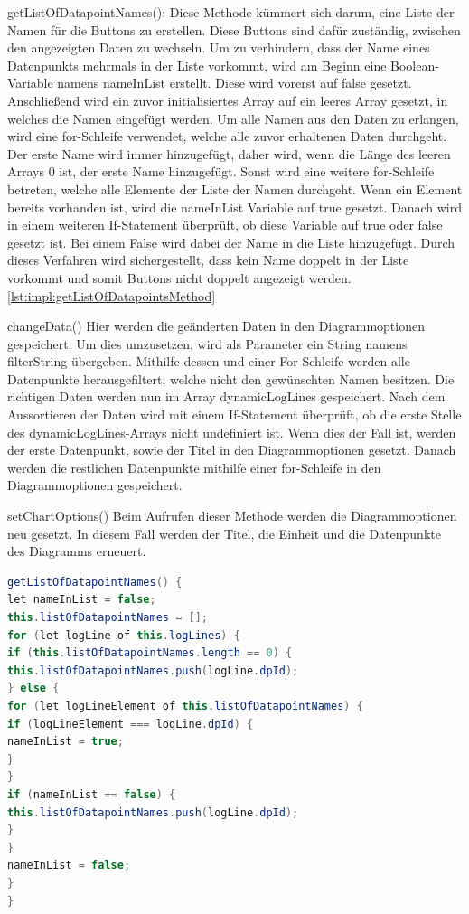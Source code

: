 \begin{compactitem}
\item getListOfDatapointNames(): Diese Methode kümmert sich darum, eine Liste der Namen für die Buttons zu erstellen. Diese Buttons sind dafür zuständig, zwischen den angezeigten Daten zu wechseln.
Um zu verhindern, dass der Name eines Datenpunkts mehrmals in der Liste vorkommt, wird am Beginn eine Boolean-Variable namens nameInList erstellt. Diese wird vorerst auf false gesetzt.
Anschließend wird ein zuvor initialisiertes Array auf ein leeres Array gesetzt, in welches die Namen eingefügt werden. Um alle Namen aus den Daten zu erlangen, wird eine for-Schleife verwendet, welche alle zuvor erhaltenen Daten durchgeht. Der erste Name wird immer hinzugefügt, daher wird, wenn die Länge des leeren Arrays 0 ist, der erste Name hinzugefügt. Sonst wird eine weitere for-Schleife betreten, welche alle Elemente der Liste der Namen durchgeht. Wenn ein Element bereits vorhanden ist, wird die nameInList Variable auf true gesetzt. Danach wird in einem weiteren If-Statement überprüft, ob diese Variable auf true oder false gesetzt ist. Bei einem False wird dabei der Name in die Liste hinzugefügt. Durch dieses Verfahren wird sichergestellt, dass kein Name doppelt in der Liste vorkommt und somit Buttons nicht doppelt angezeigt werden. \ref{lst:impl:getListOfDatapointsMethod}
\item changeData()
Hier werden die geänderten Daten in den Diagrammoptionen gespeichert. Um dies umzusetzen, wird als Parameter ein String namens filterString übergeben. Mithilfe dessen und einer For-Schleife werden alle Datenpunkte herausgefiltert, welche nicht den gewünschten Namen besitzen. Die richtigen Daten werden nun im Array dynamicLogLines gespeichert. Nach dem Aussortieren der Daten wird mit einem If-Statement überprüft, ob die erste Stelle des dynamicLogLines-Arrays nicht undefiniert ist. Wenn dies der Fall ist, werden der erste Datenpunkt, sowie der Titel in den Diagrammoptionen gesetzt. Danach werden die restlichen Datenpunkte mithilfe einer for-Schleife in den Diagrammoptionen gespeichert.
\item setChartOptions()
Beim Aufrufen dieser Methode werden die Diagrammoptionen neu gesetzt. In diesem Fall werden der Titel, die Einheit und die Datenpunkte des Diagramms erneuert.
\end{compactitem}




\begin{lstlisting}[language=java,caption=getListOfDatapointNames()-Methode,label=lst:impl:getListOfDatapointsMethod]
getListOfDatapointNames() {
let nameInList = false;
this.listOfDatapointNames = [];
for (let logLine of this.logLines) {
if (this.listOfDatapointNames.length == 0) {
this.listOfDatapointNames.push(logLine.dpId);
} else {
for (let logLineElement of this.listOfDatapointNames) {
if (logLineElement === logLine.dpId) {
nameInList = true;
}
}
if (nameInList == false) {
this.listOfDatapointNames.push(logLine.dpId);
}
}
nameInList = false;
}
}
\end{lstlisting}



